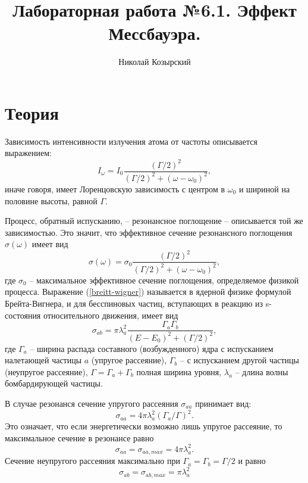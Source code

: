 \documentclass[12pt,a4paper]{article}
\author{Николай Козырский}
\title{Лабораторная работа №6.1. Эффект Мессбауэра.}
\begin{document}
\maketitle
\section{Теория}
Зависимость интенсивности излучения атома от частоты описывается выражением:
\begin{equation}
I_\omega = I_0 \frac{\left( \Gamma /2 \right)^2}{\left( \Gamma /2 \right)^2 + (\omega - \omega_0)^2},
\end{equation}
иначе говоря, имеет Лоренцовскую зависимость с центром в $\omega_0$ и шириной на половине высоты, равной $\Gamma$.

Процесс, обратный испусканию, -- резонансное поглощение -- описывается той же зависимостью. Это значит, что эффективное сечение резонансного поглощения $\sigma(\omega)$ имеет вид
\begin{equation} \label{breitt-wigner}
\sigma(\omega) = \sigma_0 \frac{\left( \Gamma /2 \right)^2}{\left( \Gamma /2 \right)^2 + (\omega - \omega_0)^2},
\end{equation}
где $\sigma_0$ -- максимальное эффективное сечение поглощения, определяемое физикой процесса. Выражение  (\ref{breitt-wigner}) называется в ядерной физике формулой Брейта-Вигнера, и для бесспиновых частиц, вступающих в реакцию из s-состояния относительного движения, имеет вид
\begin{equation}
\sigma_{ab} = \pi \lambda_a^2 \frac{\Gamma_a \Gamma_b}{(E-E_0)^2 + (\Gamma / 2)^2},
\end{equation}
где $\Gamma_a$ -- ширина распада составного (возбужденного) ядра с испусканием налетающей частицы $a$ (упругое рассеяние), $\Gamma_b$ -- с испусканием другой частицы (неупругое рассеяние), $\Gamma = \Gamma_a + \Gamma_b$ полная ширина уровня, $\lambda_a$ -- длина волны бомбардирующей частицы. 

В случае резонанся сечение упругого рассеяния $\sigma_{aa}$ принимает вид:
\begin{equation}
\sigma_{aa} = 4 \pi \lambda_a^2 (\Gamma_a / \Gamma)^2.
\end{equation}
Это означает, что если энергетически возможно лишь упругое рассеяние, то максимальное сечение в резонансе равно 
\begin{equation}
\sigma_{aa} = \sigma_{aa,max} = 4 \pi \lambda_a^2.
\end{equation}
Сечение неупругого рассеяния максимально при $\Gamma_a = \Gamma_b = \Gamma /2$  и равно 
\begin{equation}
\sigma_{ab} = \sigma_{ab, max} = \pi \lambda_a^2
\end{equation}
\end{document}
